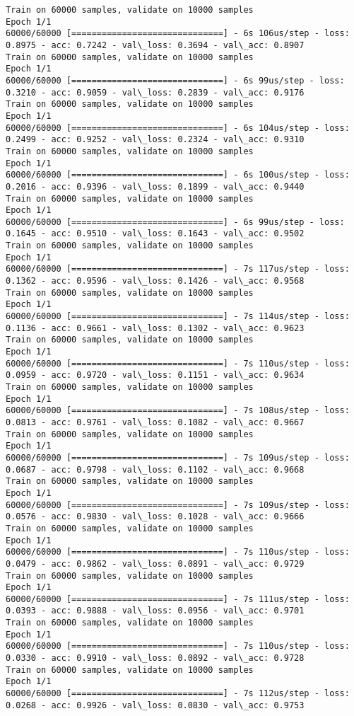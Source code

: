 \documentclass[11pt]{article}
\begin{document}
    \begin{Verbatim}[commandchars=\\\{\}]
Train on 60000 samples, validate on 10000 samples
Epoch 1/1
60000/60000 [==============================] - 6s 106us/step - loss: 0.8975 - acc: 0.7242 - val\_loss: 0.3694 - val\_acc: 0.8907
Train on 60000 samples, validate on 10000 samples
Epoch 1/1
60000/60000 [==============================] - 6s 99us/step - loss: 0.3210 - acc: 0.9059 - val\_loss: 0.2839 - val\_acc: 0.9176
Train on 60000 samples, validate on 10000 samples
Epoch 1/1
60000/60000 [==============================] - 6s 104us/step - loss: 0.2499 - acc: 0.9252 - val\_loss: 0.2324 - val\_acc: 0.9310
Train on 60000 samples, validate on 10000 samples
Epoch 1/1
60000/60000 [==============================] - 6s 100us/step - loss: 0.2016 - acc: 0.9396 - val\_loss: 0.1899 - val\_acc: 0.9440
Train on 60000 samples, validate on 10000 samples
Epoch 1/1
60000/60000 [==============================] - 6s 99us/step - loss: 0.1645 - acc: 0.9510 - val\_loss: 0.1643 - val\_acc: 0.9502
Train on 60000 samples, validate on 10000 samples
Epoch 1/1
60000/60000 [==============================] - 7s 117us/step - loss: 0.1362 - acc: 0.9596 - val\_loss: 0.1426 - val\_acc: 0.9568
Train on 60000 samples, validate on 10000 samples
Epoch 1/1
60000/60000 [==============================] - 7s 114us/step - loss: 0.1136 - acc: 0.9661 - val\_loss: 0.1302 - val\_acc: 0.9623
Train on 60000 samples, validate on 10000 samples
Epoch 1/1
60000/60000 [==============================] - 7s 110us/step - loss: 0.0959 - acc: 0.9720 - val\_loss: 0.1151 - val\_acc: 0.9634
Train on 60000 samples, validate on 10000 samples
Epoch 1/1
60000/60000 [==============================] - 7s 108us/step - loss: 0.0813 - acc: 0.9761 - val\_loss: 0.1082 - val\_acc: 0.9667
Train on 60000 samples, validate on 10000 samples
Epoch 1/1
60000/60000 [==============================] - 7s 109us/step - loss: 0.0687 - acc: 0.9798 - val\_loss: 0.1102 - val\_acc: 0.9668
Train on 60000 samples, validate on 10000 samples
Epoch 1/1
60000/60000 [==============================] - 7s 109us/step - loss: 0.0576 - acc: 0.9830 - val\_loss: 0.1028 - val\_acc: 0.9666
Train on 60000 samples, validate on 10000 samples
Epoch 1/1
60000/60000 [==============================] - 7s 110us/step - loss: 0.0479 - acc: 0.9862 - val\_loss: 0.0891 - val\_acc: 0.9729
Train on 60000 samples, validate on 10000 samples
Epoch 1/1
60000/60000 [==============================] - 7s 111us/step - loss: 0.0393 - acc: 0.9888 - val\_loss: 0.0956 - val\_acc: 0.9701
Train on 60000 samples, validate on 10000 samples
Epoch 1/1
60000/60000 [==============================] - 7s 110us/step - loss: 0.0330 - acc: 0.9910 - val\_loss: 0.0892 - val\_acc: 0.9728
Train on 60000 samples, validate on 10000 samples
Epoch 1/1
60000/60000 [==============================] - 7s 112us/step - loss: 0.0268 - acc: 0.9926 - val\_loss: 0.0830 - val\_acc: 0.9753

    \end{Verbatim}
\end{document}
